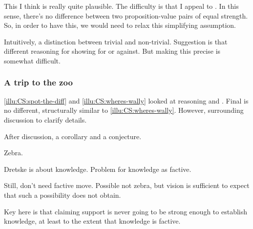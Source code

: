 \begin{note}
  This I think is really quite plausible.
  The difficulty is that I appeal to \indicateV{}.
  In this sense, there's no difference between two proposition-value pairs of equal strength.
  So, in order to have this, we would need to relax this simplifying assumption.

  Intuitively, a distinction between trivial and non-trivial.
  Suggestion is that different reasoning for showing for or against.
  But making this precise is somewhat difficult.
\end{note}

\hozline

\subsubsection{A trip to the zoo}

\begin{note}
   \ref{illu:CS:spot-the-diff} and \ref{illu:CS:wheres-wally} looked at reasoning and .
  Final  is no different, structurally similar to \autoref{illu:CS:wheres-wally}.
  However, surrounding discussion to clarify details.

  After discussion, a corollary and a conjecture.
\end{note}

\begin{note}
  Zebra.

  Dretske is about knowledge.
  Problem for knowledge as factive.

  Still, don't need factive move.
  Possible not zebra, but vision is sufficient to expect that such a possibility does not obtain.

  Key here is that claiming support is never going to be strong enough to establish knowledge, at least to the extent that knowledge is factive.
\end{note}

